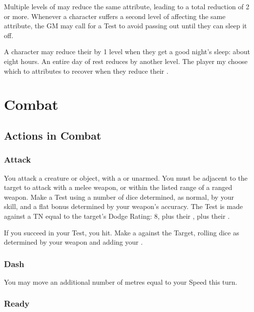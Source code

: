 Multiple levels of  may reduce the same attribute, leading to a total reduction of 2 or more.
Whenever a character suffers a second level of  affecting the same attribute, the GM may call for a Test to avoid passing out until they can sleep it off.

A character may reduce their  by 1 level when they get a good night's sleep: about eight hours.
An entire day of rest reduces  by another level.
The player my choose which to attributes to recover when they reduce their .

\section{Combat}

\subsection{Actions in Combat}

\subsubsection{Attack}

You attack a creature or object, with a  or unarmed.
You must be adjacent to the target to attack with a melee weapon, or within the listed range of a ranged weapon.
Make a Test using a number of dice determined, as normal, by your  skill, and a flat bonus determined by your weapon's accuracy.
The Test is made against a TN equal to the target's Dodge Rating: 8, plus their , plus their .

If you succeed in your Test, you hit.
Make a  against the Target, rolling dice as determined by your weapon and adding your .

\subsubsection{Dash}

You may move an additional number of metres equal to your Speed this turn.

\subsubsection{Ready}

